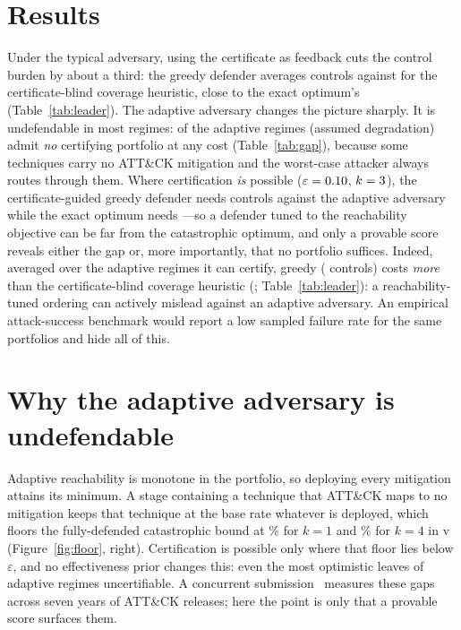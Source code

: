 \documentclass[conference,compsoc]{IEEEtran}
\begin{document}
\section{Results}
Under the typical adversary, using the certificate as feedback cuts the control
burden by about a third: the greedy defender averages \RangeGreedyTypicalCost{}
controls against \RangeCoverageTypicalCost{} for the certificate-blind coverage
heuristic, close to the exact optimum's \RangeOptimalTypicalCost{}
(Table~\ref{tab:leader}). The adaptive adversary changes the picture sharply. It is
undefendable in most regimes: \RangeAdaptiveUncert{} of the \RangeAdaptiveRegimes{}
adaptive regimes (assumed degradation) admit \emph{no} certifying portfolio at any
cost (Table~\ref{tab:gap}), because some techniques carry no ATT\&CK mitigation and
the worst-case attacker always routes through them. Where certification \emph{is}
possible ($\varepsilon=0.10$, $k=3$), the certificate-guided
greedy defender needs \RangeAdvExGreedy{} controls against the adaptive adversary
while the exact optimum needs \RangeAdvExOptimal{}---so a defender tuned to the
reachability objective can be far from the catastrophic optimum, and only a provable
score reveals either the gap or, more importantly, that no portfolio suffices. Indeed,
averaged over the adaptive regimes it can certify, greedy (\RangeGreedyAdaptiveCost{}
controls) costs \emph{more} than the certificate-blind coverage heuristic
(\RangeCoverageAdaptiveCost{}; Table~\ref{tab:leader}): a reachability-tuned ordering
can actively mislead against an adaptive adversary. An empirical attack-success
benchmark would report a low sampled failure rate for the same portfolios and hide
all of this.

\section{Why the adaptive adversary is undefendable}
Adaptive reachability is monotone in the portfolio, so deploying every mitigation
attains its minimum. A stage containing a technique that ATT\&CK maps to no mitigation
keeps that technique at the base rate whatever is deployed, which floors the
fully-defended catastrophic bound at \RangeFloorKOnePct\% for $k{=}1$ and
\RangeFloorKFourPct\% for $k{=}4$ in v\RangeAttackVersion{} (Figure~\ref{fig:floor},
right). Certification is possible only where that floor lies below $\varepsilon$, and
no effectiveness prior changes this: even the most optimistic leaves
\RangePriorMinUncert{} of \RangePriorRegimes{} adaptive regimes uncertifiable. A
concurrent submission~\cite{anon2026gaps} measures these gaps across seven years of
ATT\&CK releases; here the point is only that a provable score surfaces them.
\end{document}
